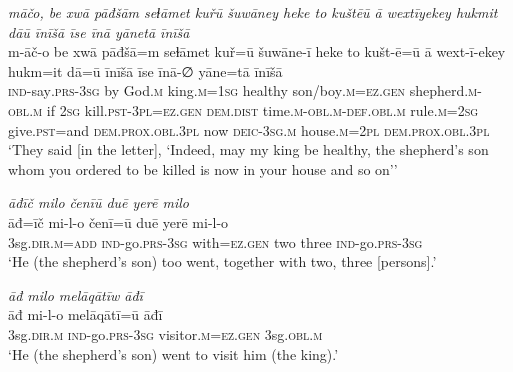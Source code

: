 \ea \label{KŠ.51}
\textit{māčo, be xwā pāđšām seɫāmet kuřū šuwāney heke to kuštēū ā wextīyekey hukmit dāū īnīšā īse īnā yānetā īnīšā} \\ 
\gll m-āč-o be xwā pāđšā=m seɫāmet kuř=ū šuwāne-ī heke to kušt-ē=ū ā wext-ī-ekey hukm=it dā=ū īnīšā īse īnā-∅ yāne=tā īnīšā \\ 
 \textsc{ind-}say\textsc{.prs}\textsc{-3sg} by God\textsc{.m} king\textsc{.m}\textsc{=\textsc{1sg}} healthy son/boy\textsc{.m}\textsc{=ez.gen} shepherd\textsc{.m}\textsc{-obl}\textsc{.m} if \textsc{2sg} kill\textsc{.pst}\textsc{-3pl}\textsc{=ez.gen} \textsc{dem.dist} time\textsc{.m}\textsc{-obl}\textsc{.m}\textsc{-def}\textsc{.obl}\textsc{.m} rule\textsc{.m}\textsc{=\textsc{2sg}} give\textsc{.pst}=and \textsc{dem.prox}\textsc{.obl}\textsc{.3pl} now \textsc{deic}\textsc{-3sg}\textsc{.m} house\textsc{.m}=\textsc{2pl} \textsc{dem.prox}\textsc{.obl}\textsc{.3pl} \\ 
\glt `They said [in the letter], ‘Indeed, may my king be healthy, the shepherd’s son whom you ordered to be killed is now in your house and so on’'
\z 
 
\ea \label{KŠ.54}
\textit{āđīč milo čenīū duē yerē milo} \\ 
\gll āđ=īč mi-l-o čenī=ū duē yerē mi-l-o \\ 
 3sg\textsc{.dir}\textsc{.m}\textsc{=add} \textsc{ind-}go\textsc{.prs}\textsc{-3sg} with\textsc{=ez.gen} two three \textsc{ind-}go\textsc{.prs}\textsc{-3sg} \\ 
\glt `He (the shepherd’s son) too went, together with two, three [persons].'
\z 
 
\ea \label{KŠ.55}
\textit{āđ milo melāqātīw āđī} \\ 
\gll āđ mi-l-o melāqātī=ū āđī \\ 
 3sg\textsc{.dir}\textsc{.m} \textsc{ind-}go\textsc{.prs}\textsc{-3sg} visitor\textsc{.m}\textsc{=ez.gen} 3sg\textsc{.obl}\textsc{.m} \\ 
\glt `He (the shepherd’s son) went to visit him (the king).'
\z 
 
